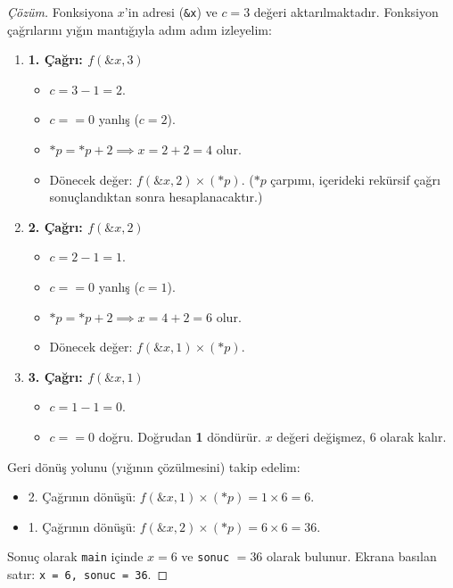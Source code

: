 \begin{proof}[Çözüm]
Fonksiyona $x$'in adresi (\texttt{\&x}) ve $c=3$ değeri aktarılmaktadır. Fonksiyon çağrılarını yığın mantığıyla adım adım izleyelim:

\begin{enumerate}
    \item \textbf{1. Çağrı: $f(\&x, 3)$}
    \begin{itemize}
        \item $c = 3 - 1 = 2$.
        \item $c == 0$ yanlış ($c=2$).
        \item $*p = *p + 2 \implies x = 2 + 2 = 4$ olur.
        \item Dönecek değer: $f(\&x, 2) \times (*p)$. ($*p$ çarpımı, içerideki rekürsif çağrı sonuçlandıktan sonra hesaplanacaktır.)
    \end{itemize}
    
    \item \textbf{2. Çağrı: $f(\&x, 2)$}
    \begin{itemize}
        \item $c = 2 - 1 = 1$.
        \item $c == 0$ yanlış ($c=1$).
        \item $*p = *p + 2 \implies x = 4 + 2 = 6$ olur.
        \item Dönecek değer: $f(\&x, 1) \times (*p)$.
    \end{itemize}
    
    \item \textbf{3. Çağrı: $f(\&x, 1)$}
    \begin{itemize}
        \item $c = 1 - 1 = 0$.
        \item $c == 0$ doğru. Doğrudan \textbf{1} döndürür. $x$ değeri değişmez, $6$ olarak kalır.
    \end{itemize}
\end{enumerate}

Geri dönüş yolunu (yığının çözülmesini) takip edelim:
\begin{itemize}
    \item 2. Çağrının dönüşü: $f(\&x, 1) \times (*p) = 1 \times 6 = 6$.
    \item 1. Çağrının dönüşü: $f(\&x, 2) \times (*p) = 6 \times 6 = 36$.
\end{itemize}
Sonuç olarak \texttt{main} içinde $x = 6$ ve \texttt{sonuc} $= 36$ olarak bulunur.
Ekrana basılan satır: \texttt{x = 6, sonuc = 36}.
\end{proof}

